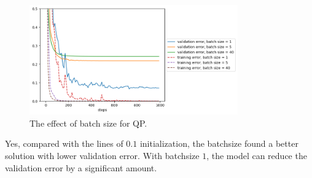 \begin{answer}
    \begin{figure}[H]
        \centering
        \includegraphics[width=0.8\textwidth]{../src/implicitreg/implicitreg_quadratic_batchsize.png}
        \caption{The effect of batch size for QP.}
        \label{fig:qp-batchsize}
    \end{figure}
    Yes, compared with the lines of $0.1$ initialization, the batchsize found a 
    better solution with lower validation error. With batchsize $1$, the model
    can reduce the validation error by a significant amount.
\end{answer}